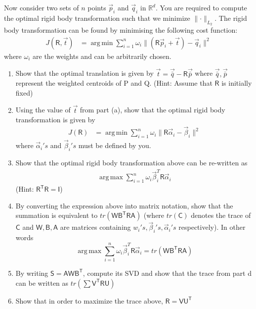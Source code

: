 \documentclass[a4paper, 11pt]{article}
\newcommand{\mat}[1]{\boldsymbol { \mathsf{#1}} }
\DeclareMathOperator*{\argmax}{arg\,max}
\DeclareMathOperator*{\argmin}{arg\,min}
\newcommand{\norm}[1]{\lVert#1\rVert}
\newcommand{\R}{\mathbb{R}}
\begin{document}
\begin{enumerate}
Now consider two sets of $n$ points $\vec p_i$ and $\vec q_i$ in $\R^d$. You are required to compute the optimal rigid body transformation such that we minimize  $\norm{\cdot}_{L_2}$. The rigid body transformation can be found by minimising the following cost function: 
\begin{align*}
  J(\mat R,\vec t) &= \argmin\sum_{i=1}^{n}\omega_i\norm{(\mat R\vec p_i+\vec t)-\vec q_i}^2
\end{align*}
where $\omega_i$ are the weights and can be arbitrarily chosen.
\begin{enumerate}[label=\alph*.]
    \item Show that the optimal translation is given by $\vec t = \vec{\bar q} - \mat R\vec{\bar p}$ where $\vec{\bar q}, \vec{\bar p} $ represent the weighted centroids of P and Q. 
    (Hint: Assume that $\mat R$ is initially fixed)
    \item Using the value of $\vec t$ from part (a), show that the optimal rigid body transformation is given by 
        \begin{align*}
          J(\mat R) &= \argmin\sum_{i=1}^{n}\omega_i\norm{\mat R\vec\alpha_i - \vec\beta_i}^2
        \end{align*} where $\vec\alpha_i's$ and $\vec\beta_i's$ must be defined by you.
        
    \item Show that the optimal rigid body transformation above can be re-written as 
        \begin{align*}
          \argmax\sum_{i=1}^{n}\omega_i\vec\beta_{i}^{T}\mat R\vec\alpha_i
        \end{align*}
        (Hint: $\mat{R^TR} = \mat I $) 
        
    \item By converting the expression above into matrix notation, show that the summation is equivalent to $tr(\mat{WB^TRA})$ (where $tr(\mat C)$ denotes the trace of $\mat C$ and $\mat W, \mat B, \mat A $ are matrices containing $ w_i's, \vec\beta_i's, \vec\alpha_i's$ respectively). In other words 
    \[\argmax\sum_{i=1}^{n}\omega_i\vec\beta_{i}^{T}\mat R\vec\alpha_i = tr(\mat{WB^TRA}) \]
    
    \item By writing $\mat S = \mat {AWB^T}$, compute its SVD and show that the trace from part d can be written as $tr(\mat{\sum V^TRU})$
    \item Show that in order to maximize the trace above, $\mat R = \mat {VU^T}$
    

\end{enumerate}
\end{enumerate}
\end{document}
